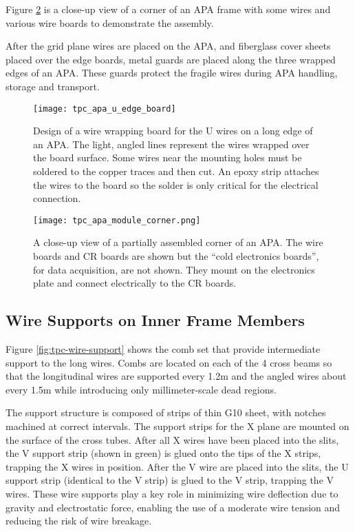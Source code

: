 Figure \ref{fig:tpc-APA-corner} is a close-up view of a corner of an APA frame with some wires and various wire boards to demonstrate the assembly.

After the grid plane wires are placed on the APA, and fiberglass cover sheets placed over the edge boards, metal guards are placed along the three wrapped edges of an APA. These guards protect the fragile wires during APA handling, storage and transport.



\begin{figure}[htpb]
\centering
\texttt{[image: tpc\_apa\_u\_edge\_board]}
\caption{Design of a wire wrapping board for the U wires on a long edge of an APA. The light, angled lines represent the wires wrapped over the board surface. Some wires near the mounting holes must be soldered to the copper traces and then cut.  An epoxy strip attaches the wires to the board so the solder is only critical for the electrical connection.}
\label{fig:tpc-wire-board-u-side}
\end{figure}

\begin{figure}[htbp]
\centering
\texttt{[image: tpc\_apa\_module\_corner.png]}
\caption[Closeup view of a partially assembled corner of an APA]{A close-up view of a partially assembled corner of an APA.  The wire boards and CR boards are shown but the “cold electronics boards”, for data acquisition, are not shown.  They mount on the electronics plate and connect electrically to the CR boards. }
\label{fig:tpc-APA-corner}
\end{figure}

\subsection{Wire Supports on Inner Frame Members}

Figure \ref{fig:tpc-wire-support} shows the comb set that provide intermediate support to the long wires.  Combs are located on each of the 4 cross beams so that the longitudinal wires are supported every 1.2m and the angled wires about every 1.5m while introducing only millimeter-scale dead regions.

The support structure is composed of strips of thin G10 sheet, with notches machined at correct intervals. The support strips for the X plane are mounted on the surface of the cross tubes.  After all X wires have been placed into the slits, the V support strip (shown in green) is glued onto the tips of the X strips, trapping the X wires in position.  After the V wire are placed into the slits, the U support strip (identical to the V strip) is glued to the V strip, trapping the V wires.  These wire supports play a key role in minimizing wire deflection due to gravity and electrostatic force, enabling the use of a moderate wire tension and reducing the risk of wire breakage.



